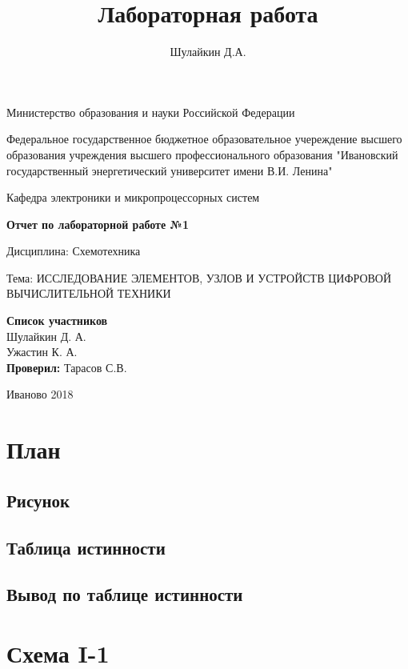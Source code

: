 \documentclass[a4paper]{article}
\title{Лабораторная работа}
\author{Шулайкин Д.А.}
\begin{document}
\onehalfspacing
\thispagestyle{empty}
\begin{center}
Министерство образования и науки Российской Федерации
\vspace{10pt}

Федеральное государственное бюджетное образовательное учереждение высшего образования учреждения высшего профессионального образования "Ивановский государственный энергетический университет имени В.И. Ленина"
\vspace{40pt}

Кафедра электроники и микропроцессорных систем
\vspace{40pt}

\textbf{Отчет по лабораторной работе №1}

Дисциплина: Схемотехника

Тема: ИССЛЕДОВАНИЕ ЭЛЕМЕНТОВ, УЗЛОВ И УСТРОЙСТВ ЦИФРОВОЙ ВЫЧИСЛИТЕЛЬНОЙ ТЕХНИКИ

\end{center}

\vspace{310pt}
\begin{flushright}
\textbf{Список участников} \\
Шулайкин Д. А. \\
Ужастин К. А. \\

\textbf{Проверил:}
Тарасов С.В.
\end{flushright}
\vspace{40pt}
\begin{center}
Иваново 2018
\end{center}
\pagebreak

\section{План}
\subsection{Рисунок}
\subsection{Таблица истинности}
\subsection{Вывод по таблице истинности}

\section{Схема I-1}
\end{document}
